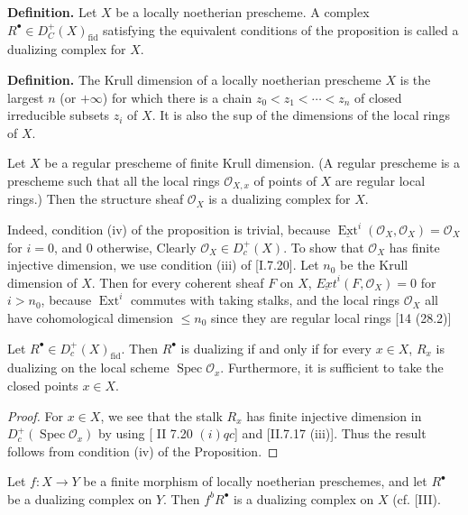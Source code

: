 \documentclass[12pt]{book}
\newcommand{\sheaf}[1]{\mathcal{#1}}
\DeclareMathOperator{\Ext}{Ext}
\begin{document}
\textbf{Definition.} Let \(X\) be a locally noetherian prescheme. A complex \(R^{\bullet} \in D_{C}^{+}(X)_{\text{fid}}\) satisfying the equivalent conditions of the proposition is called a dualizing complex for \(X\).

\textbf{Definition.} The Krull dimension of a locally noetherian prescheme \(X\) is the largest \(n\) (or \(+\infty\)) for which there is a chain \(z_{0}<z_{1}<\cdots<z_{n}\) of closed irreducible subsets \(z_{i}\) of \(X\). It is also the sup of the dimensions of the local rings of \(X\).

\setcounter{page}{259}
\begin{example}
Let \(X\) be a regular prescheme of finite Krull dimension. (A regular prescheme is a prescheme such that all the local rings \(\sheaf{O}_{X,x}\) of points of \(X\) are regular local rings.) Then the structure sheaf \(\sheaf{O}_{X}\) is a dualizing complex for \(X\).

Indeed, condition (iv) of the proposition is trivial, because \(\underline{\Ext}^{i}(\sheaf{O}_{X},\sheaf{O}_{X})=\sheaf{O}_{X}\) for \(i=0\), and \(0\) otherwise, Clearly \(\sheaf{O}_{X} \in D_{c}^{+}(X)\). To show that \(\sheaf{O}_{X}\) has finite injective dimension, we use condition (iii) of [I.7.20]. Let \(n_{0}\) be the Krull dimension of \(X\). Then for every coherent sheaf \(F\) on \(X\), \(\underline{Ext}^{i}(F,\sheaf{O}_{X})=0\) for \(i>n_{0}\), because \(\Ext^{i}\) commutes with taking stalks, and the local rings \(\sheaf{O}_{X}\) all have cohomological dimension \(\le n_{0}\) since they are regular local rings [14 (28.2)]
\end{example}

\begin{corollary}
Let \(R^{\bullet} \in D_{c}^{+}(X)_{\text{fid}}\). Then \(R^{\bullet}\) is dualizing if and only if for every \(x \in X\), \(R_{x}\) is dualizing on the local scheme \(\operatorname{Spec}\sheaf{O}_{x}\). Furthermore, it is sufficient to take the closed points \(x \in X\).
\end{corollary}

\begin{proof}
For \(x \in X\), we see that the stalk \(R_{x}\) has finite injective dimension in \(D_{c}^{+}(\operatorname{Spec}\sheaf{O}_{x})\) by using [ II 7.20 \((i) qc\)] and [II.7.17 (iii)]. Thus the result follows from condition (iv) of the Proposition.
\end{proof}

\setcounter{page}{260}
\begin{proposition}
Let \(f: X \to Y\) be a finite morphism of locally noetherian preschemes, and let \(R^{\bullet}\) be a dualizing complex on \(Y\). Then \(f^{b} R^{\bullet}\) is a dualizing complex on \(X\) (cf. [III).
\end{proposition}
\end{document}
